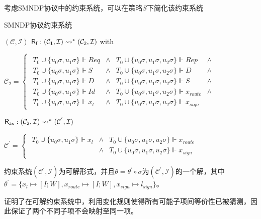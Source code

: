 考虑SMNDP协议中的约束系统，可以在策略$S$下简化该约束系统
\begin{table}
\caption{SMNDP协议约束系统}

$(\mathcal{C},\mathcal{I})$
$\text{\ensuremath{\mathsf{R_{f}:(\mathcal{C}_{1},\mathcal{I})\rightsquigarrow^{*}(\mathcal{C}_{2},\mathcal{I})}}}$
with 

$\mathcal{C}_{2}=\begin{cases}
\begin{array}{cccc}
T_{0}\cup\{u_{0}\sigma,u_{1}\sigma\}\Vdash Req & \land & T_{0}\cup\{u_{0}\sigma,u_{1}\sigma,u_{2}\sigma\}\Vdash Rep & \land\\
T_{0}\cup\{u_{0}\sigma,u_{1}\sigma\}\Vdash S & \land & T_{0}\cup\{u_{0}\sigma,u_{1}\sigma,u_{2}\sigma\}\Vdash D & \land\\
T_{0}\cup\{u_{0}\sigma,u_{1}\sigma\}\Vdash D & \land & T_{0}\cup\{u_{0}\sigma,u_{1}\sigma,u_{2}\sigma\}\Vdash S & \land\\
T_{0}\cup\{u_{0}\sigma,u_{1}\sigma\}\Vdash Id & \land & T_{0}\cup\{u_{0}\sigma,u_{1}\sigma,u_{2}\sigma\}\Vdash x_{route} & \land\\
T_{0}\cup\{u_{0}\sigma,u_{1}\sigma\}\Vdash x_{l} & \land & T_{0}\cup\{u_{0}\sigma,u_{1}\sigma,u_{2}\sigma\}\Vdash x_{sign}
\end{array}\end{cases}$

$\text{\ensuremath{\mathsf{R_{ax}:(\mathcal{C}_{2},\mathcal{I})\rightsquigarrow^{*}(\mathcal{C}^{'},\mathcal{I})}}}$


$\mathcal{C}^{'}=\begin{cases}
\begin{array}{ccc}
T_{0}\cup\{u_{0}\sigma,u_{1}\sigma\}\Vdash x_{l} & \land & T_{0}\cup\{u_{0}\sigma,u_{1}\sigma,u_{2}\sigma\}\Vdash x_{route}\\
& \land & T_{0}\cup\{u_{0}\sigma,u_{1}\sigma,u_{2}\sigma\}\Vdash x_{sign}
\end{array}\end{cases}$
\end{table}

约束系统$(\mathcal{C}^{'},\mathcal{I})$为可解形式，并且$\theta=\theta^{'}\circ\sigma$为$(\mathcal{C}^{'},\mathcal{I})$的一个解，其中$\theta^{'}=\{x_{l}\mapsto[I;W],x_{route}\mapsto[I;W],x_{sign}\mapsto l_{sign}\}$。

  证明了在可解约束系统中，利用变化规则使得所有可能子项间等价性已被猜测，因此保证了两个不同子项不会映射至同一项。

